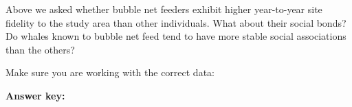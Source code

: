 \documentclass[
]{book}
\newenvironment{Shaded}{\begin{snugshade}}{\end{snugshade}}
\newcommand{\CommentTok}[1]{\textcolor[rgb]{0.56,0.35,0.01}{\textit{#1}}}
\newcommand{\DecValTok}[1]{\textcolor[rgb]{0.00,0.00,0.81}{#1}}
\newcommand{\FunctionTok}[1]{\textcolor[rgb]{0.00,0.00,0.00}{#1}}
\newcommand{\NormalTok}[1]{#1}
\newcommand{\OtherTok}[1]{\textcolor[rgb]{0.56,0.35,0.01}{#1}}
\newcommand{\SpecialCharTok}[1]{\textcolor[rgb]{0.00,0.00,0.00}{#1}}
\newcommand{\StringTok}[1]{\textcolor[rgb]{0.31,0.60,0.02}{#1}}
\begin{document}
Above we asked whether bubble net feeders exhibit higher year-to-year site fidelity to the study area than other individuals. What about their social bonds? Do whales known to bubble net feed tend to have more stable social associations than the others?

Make sure you are working with the correct data:

\begin{Shaded}
\end{Shaded}

\textbf{Answer key:}
\end{document}
